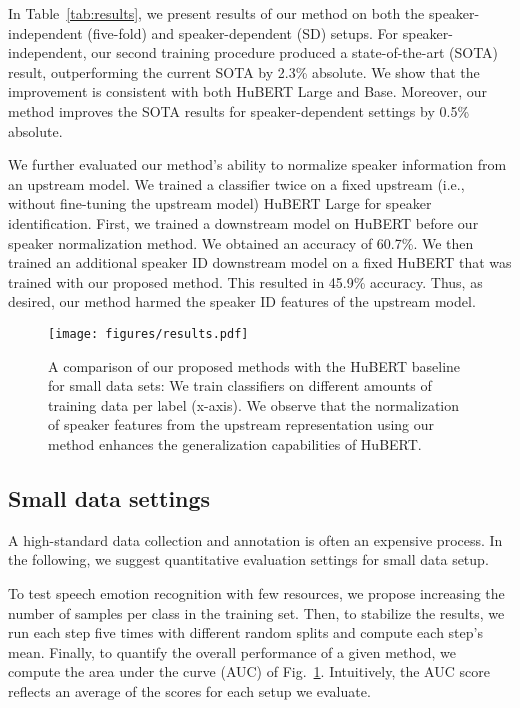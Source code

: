 \documentclass{article}
\renewcommand{\[}{\begin{eqnarray}}
\renewcommand{\]}{\end{eqnarray}}
\begin{document}
In Table~\ref{tab:results}, we present results of our method on both the speaker-independent (five-fold) and speaker-dependent (SD) setups. For speaker-independent, our second training procedure produced a state-of-the-art (SOTA) result, outperforming the current SOTA by 2.3\% absolute. We show that the improvement is consistent with both HuBERT Large and Base. Moreover, our method improves the SOTA results for speaker-dependent settings by 0.5\% absolute.

We further evaluated our method's ability to normalize speaker information from an upstream model. We trained a classifier twice on a fixed upstream (i.e., without fine-tuning the upstream model) HuBERT Large for speaker identification. First, we trained a downstream model on HuBERT before our speaker normalization method. We obtained an accuracy of 60.7\%. We then trained an additional speaker ID downstream model on a fixed HuBERT that was trained with our proposed method. This resulted in 45.9\% accuracy. Thus, as desired, our method harmed the speaker ID features of the upstream model.

\begin{figure}[t!]
    \centering
    \texttt{[image: figures/results.pdf]}
    \caption{A comparison of our proposed methods with the HuBERT baseline for small data sets: We train classifiers on different amounts of training data per label (x-axis). We observe that the normalization of speaker features from the upstream representation using our method enhances the generalization capabilities of HuBERT.}
    \label{fig:results}
\end{figure}

\subsection{Small data settings}\label{sec:low_resource_experiment}

A high-standard data collection and annotation is often an expensive process. In the following, we suggest quantitative evaluation settings for small data setup.

To test speech emotion recognition with few resources, we propose increasing the number of samples per class in the training set. Then, to stabilize the results, we run each step five times with different random splits and compute each step's mean. Finally, to quantify the overall performance of a given method, we compute the area under the curve (AUC) of Fig.~\ref{fig:results}. Intuitively, the AUC score reflects an average of the scores for each setup we evaluate.
\end{document}
